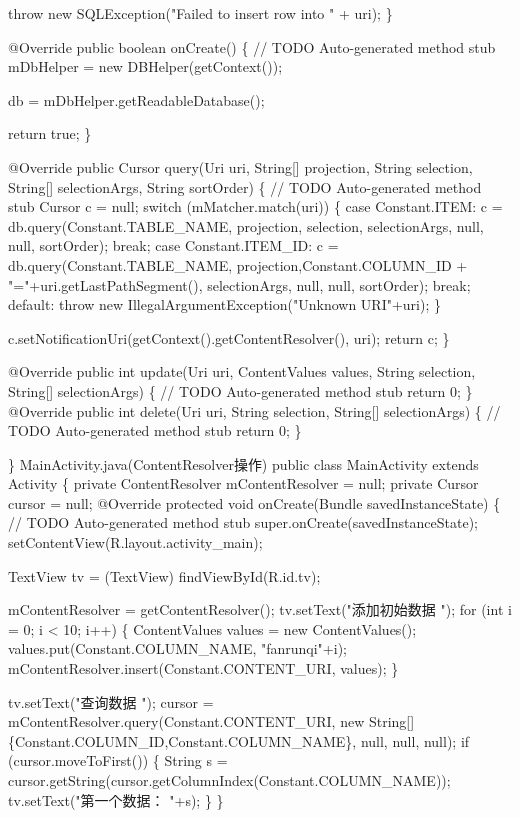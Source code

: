 \documentclass[9pt, b5paper]{article}
\begin{document}
    throw new SQLException("Failed to insert row into " + uri);    
\}    

@Override    
public boolean onCreate() \{    
    // TODO Auto-generated method stub    
    mDbHelper = new DBHelper(getContext());    

db = mDbHelper.getReadableDatabase();    

    return true;    
\}    

@Override    
public Cursor query(Uri uri, String[] projection, String selection,    
        String[] selectionArgs, String sortOrder) \{    
    // TODO Auto-generated method stub    
    Cursor c = null;    
    switch (mMatcher.match(uri)) \{    
    case Constant.ITEM:    
        c =  db.query(Constant.TABLE\_NAME, projection, selection, selectionArgs, null, null, sortOrder);    
        break;    
    case Constant.ITEM\_ID:    
        c = db.query(Constant.TABLE\_NAME, projection,Constant.COLUMN\_ID + "="+uri.getLastPathSegment(), selectionArgs, null, null, sortOrder);    
        break;    
    default:    
        throw new IllegalArgumentException("Unknown URI"+uri);    
    \}    

    c.setNotificationUri(getContext().getContentResolver(), uri);    
    return c;    
\}    

@Override    
public int update(Uri uri, ContentValues values, String selection,    
        String[] selectionArgs) \{    
    // TODO Auto-generated method stub    
    return 0;    
\}
@Override
public int delete(Uri uri, String selection, String[] selectionArgs) \{
    // TODO Auto-generated method stub
    return 0;
\}    

\}    
MainActivity.java(ContentResolver操作)
public class MainActivity extends Activity \{
    private ContentResolver mContentResolver = null; 
    private Cursor cursor = null;  
         @Override
        protected void onCreate(Bundle savedInstanceState) \{
            // TODO Auto-generated method stub
            super.onCreate(savedInstanceState);
            setContentView(R.layout.activity\_main);

TextView tv = (TextView) findViewById(R.id.tv);

mContentResolver = getContentResolver();  
tv.setText("添加初始数据 ");
for (int i = 0; i < 10; i++) \{  
    ContentValues values = new ContentValues();  
    values.put(Constant.COLUMN\_NAME, "fanrunqi"+i);  
    mContentResolver.insert(Constant.CONTENT\_URI, values);  
\} 

        tv.setText("查询数据 ");
        cursor = mContentResolver.query(Constant.CONTENT\_URI, new String[]\{Constant.COLUMN\_ID,Constant.COLUMN\_NAME\}, null, null, null);  
        if (cursor.moveToFirst()) \{
            String s = cursor.getString(cursor.getColumnIndex(Constant.COLUMN\_NAME));
            tv.setText("第一个数据： "+s);
        \}
\}
\end{document}
